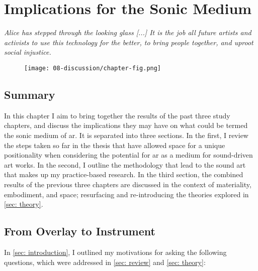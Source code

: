 \chapter{Implications for the Sonic Medium}
\label{sec: discussion}
\epigraph{\emph{Alice has stepped through the looking glass [...] It is the job all future artists and activists to use this technology for the better, to bring people together, and uproot social injustice.}}{\citep[]{skwarek2018}}

\begin{figure}
    \centering
    \texttt{[image: 08-discussion/chapter-fig.png]}
    \captionsetup{labelformat=empty}
    \caption[Participants experiencing and demonstrating usage of Project North Star (own photographs)]{}
\end{figure}

\clearpage
\section{Summary}\label{sec: discussion-summary}
In this chapter I aim to bring together the results of the past three study chapters, and discuss the implications they may have on what could be termed the sonic medium of \gls{ar}. It is separated into three sections. In the first, I review the steps taken so far in the thesis that have allowed space for a unique positionality when considering the potential for \gls{ar} as a medium for sound-driven art works. In the second, I outline the methodology that lead to the sound \gls{art} that makes up my practice-based research. In the third section, the combined results of the previous three chapters are discussed in the context of materiality, embodiment, and space; resurfacing and re-introducing the theories explored in \autoref{sec: theory}.
\section{From Overlay to Instrument}\label{sec: discussion-review}
In \autoref{sec: introduction}, I outlined my motivations for asking the following questions, which were addressed in \autoref{sec: review} and \autoref{sec: theory}: 

